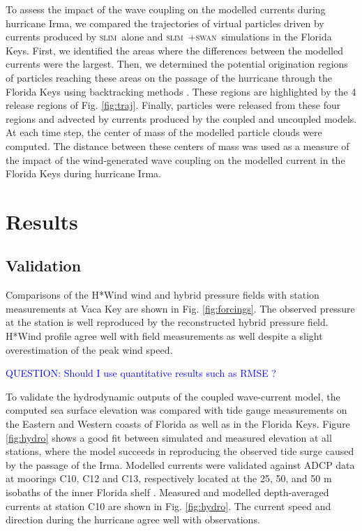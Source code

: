 \documentclass[11pt,a4paper]{article}
\newcommand{\slim}{\textsc{slim}\ }
\newcommand{\swan}{\textsc{swan}\ }
\begin{document}
To assess the impact of the wave coupling on the modelled currents during hurricane Irma, we compared the trajectories of virtual particles driven by currents produced by \slim alone and \slim+\swan simulations in the Florida Keys. First, we identified the areas where the differences between the modelled currents were the largest. Then, we determined the potential origination regions of particles reaching these areas on the passage of the hurricane through the Florida Keys using backtracking methods \citep{dobbelaerereport}. These regions are highlighted by the 4 release regions of Fig. \ref{fig:traj}. Finally, particles were released from these four regions and advected by currents produced by the coupled and uncoupled models. At each time step, the center of mass of the modelled particle clouds were computed. The distance between these centers of mass was used as a measure of the impact of the wind-generated wave coupling on the modelled current in the Florida Keys during hurricane Irma.

\section{Results}

\subsection{Validation}

Comparisons of the H*Wind wind and hybrid pressure fields with station measurements at Vaca Key are shown in Fig. \ref{fig:forcings}. The observed pressure at the station is well reproduced by the reconstructed hybrid pressure field. H*Wind profile agree well with field measurements as well despite a slight overestimation of the peak wind speed.

\textcolor{blue}{QUESTION: Should I use quantitative results such as RMSE ?}

To validate the hydrodynamic outputs of the coupled wave-current model, the computed sea surface elevation was compared with tide gauge measurements on the Eastern and Western coasts of Florida as well as in the Florida Keys. Figure \ref{fig:hydro} shows a good fit between simulated and measured elevation at all stations, where the model succeeds in reproducing the observed tide surge caused by the passage of the Irma. Modelled currents were validated against ADCP data at moorings C10, C12 and C13, respectively located at the 25, 50, and 50 m isobaths of the inner Florida shelf \citep{liu2020impacts}. Measured and modelled depth-averaged currents at station C10 are shown in Fig. \ref{fig:hydro}. The current speed and direction during the hurricane agree well with observations.
\end{document}
